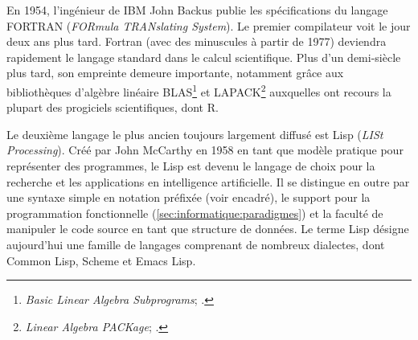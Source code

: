 En 1954, l'ingénieur de IBM John Backus publie les spécifications du
langage FORTRAN (\emph{FORmula TRANslating System}). Le premier
compilateur voit le jour deux ans plus tard. Fortran (avec des
minuscules à partir de 1977) deviendra rapidement le langage standard
dans le calcul scientifique. Plus d'un demi-siècle plus tard, son
empreinte demeure importante, notamment grâce aux bibliothèques
d'algèbre linéaire BLAS\footnote{%
  \emph{Basic Linear Algebra Subprograms};
  .} %
et LAPACK\footnote{%
  \emph{Linear Algebra PACKage};
  .} %
auxquelles ont recours la plupart des progiciels scientifiques, dont
R.

\begin{figure}[t]
\end{figure}

Le deuxième langage le plus ancien toujours largement diffusé est Lisp
(\emph{LISt Processing}). Créé par John McCarthy en 1958 en tant
que modèle pratique pour représenter des programmes, le Lisp est
devenu le langage de choix pour la recherche et les applications en
intelligence artificielle. Il se distingue en outre par une syntaxe
simple en notation préfixée (voir encadré), le support pour la
programmation fonctionnelle (\autoref{sec:informatique:paradigmes}) et
la faculté de manipuler le code source en tant que structure de
données. Le terme Lisp désigne aujourd'hui une famille de langages
comprenant de nombreux dialectes, dont Common Lisp, Scheme et Emacs
Lisp.

